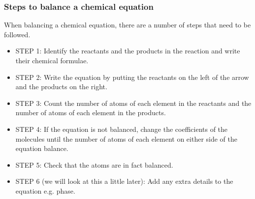             \subsubsection{ Steps to balance a chemical equation}
            \nopagebreak
        \label{m38726*id63708}When balancing a chemical equation, there are a number of steps that need to be followed.\par 
        \label{m38726*id63712}\begin{itemize}[noitemsep]
            \label{m38726*uid11}\item STEP 1: Identify the reactants and the products in the reaction and write their chemical formulae.
\label{m38726*uid12}\item STEP 2: Write the equation by putting the reactants on the left of the arrow and the products on the right.
\label{m38726*uid13}\item STEP 3: Count the number of atoms of each element in the reactants and the number of atoms of each element in the products.
\label{m38726*uid14}\item STEP 4: If the equation is not balanced, change the coefficients of the molecules until the number of atoms of each element on either side of the equation balance.
\label{m38726*uid15}\item STEP 5: Check that the atoms are in fact balanced.
\label{m38726*uid16}\item STEP 6 (we will look at this a little later): Add any extra details to the equation e.g. phase.
\end{itemize}
\par
            \label{m38726*secfhsst!!!underscore!!!id296}\vspace{.5cm} 
      \noindent
